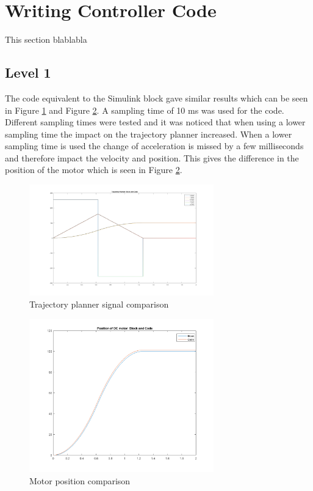\section{Writing Controller Code}
This section blablabla
\subsection{Level 1}
The code equivalent to the Simulink block gave similar results which can be seen in Figure \ref{fig:task2_traj} and Figure \ref{fig:task2_pos}. A sampling time of 10 ms was used for the code. Different sampling times were tested and it was noticed that when using a lower sampling time the impact on the trajectory planner increased. When a lower sampling time is used the change of acceleration is missed by a few milliseconds and therefore impact the velocity and position. This gives the difference in the position of the motor which is seen in Figure \ref{fig:task2_pos}.
\begin{figure}[H]
	\begin{center}
		\includegraphics[width=80mm]{task2_traj.png}
		\caption{Trajectory planner signal comparison}
		\label{fig:task2_traj}
	\end{center}
\end{figure}



\begin{figure}[H]
	\begin{center}
		\includegraphics[width=80mm]{task2_position.png}
		\caption{Motor position comparison}
		\label{fig:task2_pos}
	\end{center}
\end{figure}
